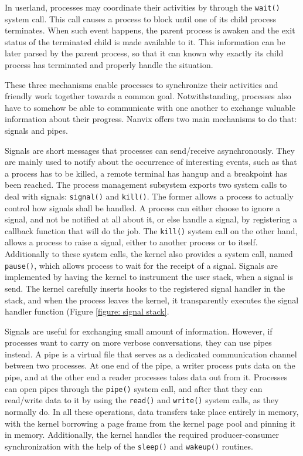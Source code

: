 \documentclass[10pt,a4paper]{article}
\begin{document}
In userland, processes may coordinate their activities by through the \texttt{wait()} system call. This call causes a process to block until one of its child process terminates. When such event happens, the parent process is awaken and the exit status of the terminated child is made available to it. This information can be later parsed by the parent process, so that it can known why exactly its child process has terminated and properly handle the situation.

These three mechanisms enable processes to synchronize their activities and friendly work together towards a common goal. Notwithstanding, processes also have to somehow be able to communicate with one another to exchange valuable information about their progress. Nanvix offers two main mechanisms to do that: signals and pipes.

Signals are short messages that processes can send/receive asynchronously. They are mainly used to notify about the occurrence of interesting events, such as that a process has to be killed, a remote terminal has hangup and a breakpoint has been reached. The process management subsystem exports two system calls to deal with signals: \texttt{signal()} and \texttt{kill()}. The former allows a process to actually control how signals shall be handled. A process can either choose to ignore a signal, and not be notified at all about it, or else handle a signal, by registering a callback function that will do the job. The \texttt{kill()} system call on the other hand, allows a process to raise a signal, either to another process or to itself. Additionally to these system calls, the kernel also provides a system call, named \texttt{pause()}, which allows process to wait for the receipt of a signal. Signals are implemented by having the kernel to instrument the user stack, when a signal is send. The kernel carefully inserts hooks to the registered signal handler in the stack, and when the process leaves the kernel, it transparently executes the signal handler function (Figure \ref{figure: signal stack}.

Signals are useful for exchanging small amount of information. However, if processes want to carry on more verbose conversations, they can use pipes instead. A pipe is a virtual file that serves as a dedicated communication channel between two processes. At one end of the pipe, a writer process puts data on the pipe, and at the other end a reader processes takes data out from it. Processes can open pipes through the \texttt{pipe()} system call, and after that they can read/write data to it by using the \texttt{read()} and \texttt{write()} system calls, as they normally do. In all these operations, data transfers take place entirely in memory, with the kernel borrowing a page frame from the kernel page pool and pinning it in memory. Additionally, the kernel handles the required producer-consumer synchronization with the help of the \texttt{sleep()} and \texttt{wakeup()} routines.
\end{document}
